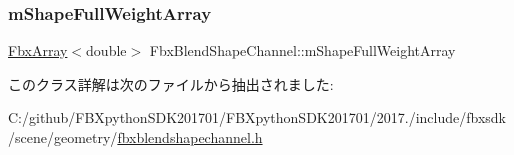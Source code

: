\subsubsection{\texorpdfstring{m\+Shape\+Full\+Weight\+Array}{mShapeFullWeightArray}}
{\footnotesize\ttfamily \hyperlink{class_fbx_array}{Fbx\+Array}$<$double$>$ Fbx\+Blend\+Shape\+Channel\+::m\+Shape\+Full\+Weight\+Array\hspace{0.3cm}{\ttfamily [protected]}}



このクラス詳解は次のファイルから抽出されました\+:\begin{DoxyCompactItemize}
\item 
C\+:/github/\+F\+B\+Xpython\+S\+D\+K201701/\+F\+B\+Xpython\+S\+D\+K201701/2017./include/fbxsdk/scene/geometry/\hyperlink{fbxblendshapechannel_8h}{fbxblendshapechannel.\+h}\end{DoxyCompactItemize}
